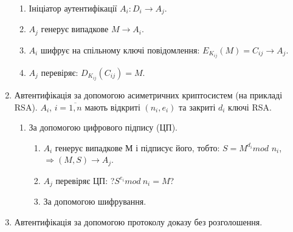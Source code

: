 \begin{enumerate}
\begin{enumerate}
  \item Ініціатор аутентифікації $A_{i}: D_{i} \rightarrow A_{j}$.
  \item $A_{j}$ генерує випадкове $M \rightarrow A_{i}$.
  \item $A_{i}$ шифрує на спільному ключі повідомлення: $E_{K_{ij}}(M) = C_{ij} \rightarrow A_{j}$.
  \item $A_{j}$ перевіряє: $D_{K_{ij}}(C_{ij}) = M$.
  \end{enumerate}
  
 \item Автентифікація за допомогою асиметричних криптосистем (на прикладі RSA).
   $A_{i}$, $i = \overline{1,n}$ мають відкриті $(n_{i}, e_{i})$ та закриті $d_{i}$ ключі RSA.
 \begin{enumerate}
   \item За допомогою цифрового підпису (ЦП).
  
   \begin{enumerate}
   \item $A_{i}$ генерує випадкове М і підписує його, тобто:
   \newline $S = M^{d_{i}}mod$ $n_{i}$, $\Rightarrow  (M, S) \rightarrow A_{j}$.
   \item $A_{j}$ перевіряє ЦП: ?$S^{e_{i}}mod \:n_i= M$?
   \item За допомогою шифрування.
   \end{enumerate}

 \end{enumerate}
 \item Автентифікація за допомогою протоколу доказу без розголошення.
\end{enumerate}